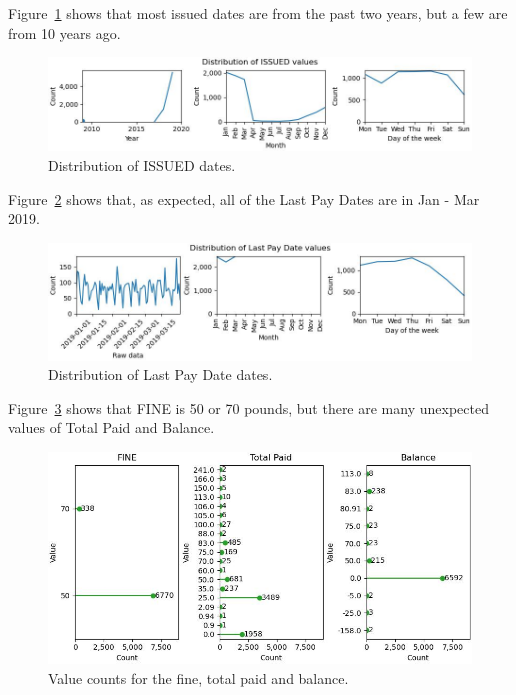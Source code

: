 \documentclass{article}
\begin{document}
Figure~\ref{fig:5} shows that most issued dates are from the past two years, but a few are from 10 years ago.

\begin{figure}[h!]
  \includegraphics[width=\linewidth]{date_distribution_1.jpg}
  \caption{Distribution of ISSUED dates.}
  \label{fig:5}
\end{figure}

Figure~\ref{fig:6} shows that, as expected, all of the Last Pay Dates are in Jan - Mar 2019.

\begin{figure}[h!]
  \includegraphics[width=\linewidth]{date_distribution_2.jpg}
  \caption{Distribution of Last Pay Date dates.}
  \label{fig:6}
\end{figure}

Figure~\ref{fig:7} shows that FINE is 50 or 70 pounds, but there are many unexpected values of Total Paid and Balance.

\begin{figure}[h!]
  \includegraphics[width=\linewidth]{value_counts balance_fine_totalpaid.jpg}
  \caption{Value counts for the fine, total paid and balance.}
  \label{fig:7}
\end{figure}
\end{document}
